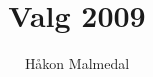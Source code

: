 \documentclass{scrartcl}
\begin{document}
\title{Valg 2009}
\author{Håkon Malmedal}
\date{}

\maketitle


\end{document}
